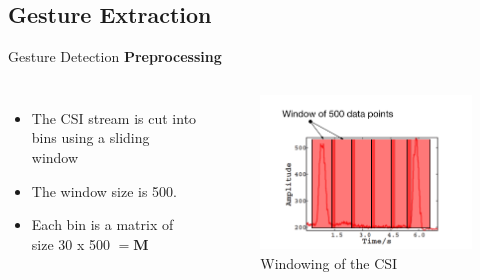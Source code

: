 \documentclass{beamer}
\begin{document}
\subsection{Gesture Extraction}
\begin{frame}{Gesture Detection}
\textbf{Preprocessing}
	\begin{columns}
			\begin{itemize}
				\item The CSI stream is cut into bins using a sliding window
				\item The window size is 500. 
				\item Each bin is a matrix of size 30 x 500 $ = \mathbf{M}$
			\end{itemize}
		
			\begin{figure}
				\includegraphics[width=1\linewidth]{Images/quals-part-1-gesture-d.png}
			\caption{Windowing of the CSI~\cite{li2016wifinger}}
			\end{figure}	
	\end{columns}
\end{frame}
\end{document}
